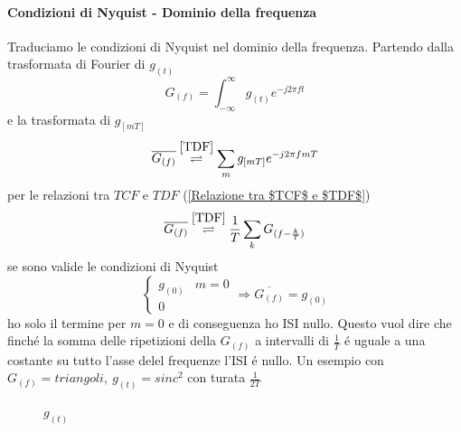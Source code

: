             \paragraph{Condizioni di Nyquist - Dominio della frequenza} Traduciamo le condizioni di Nyquist nel dominio della frequenza. Partendo
            dalla trasformata di Fourier di $g_{(t)}$
            \[
                G_{(f)} =\int_{-\infty}^{\infty}g_{(t)}e^{-j2\pi ft}    
            \]
            e la trasformata di $g_{[mT]}$
            \[
                \overline{G_{(f)}} \overset{\ref{TDF}}{\rightleftharpoons}\sum_{m}g_{[mT]}e^{-j2\pi fmT}    
            \]
            per le relazioni tra $TCF$ e $TDF$ (\ref{Relazione tra $TCF$ e $TDF$})
            \[
                \overline{G_{(f)}} \overset{\ref{TDF}}{\rightleftharpoons}\frac{1}{T}\sum_{k}G_{(f-\frac{k}{T})}    
            \]
            se sono valide le condizioni di Nyquist
            \[
                \begin{cases}
                    g_{(0)} & m=0\nonumber \\
                    0 &\nonumber
                \end{cases}  \Rightarrow \overline{G_{(f)}} = g_{(0)} 
            \]
            ho solo il termine per $m=0$ e di conseguenza ho ISI nullo. Questo vuol dire che finché la somma delle ripetizioni
            della $G_{(f)}$ a intervalli di $\frac{1}{T}$ é uguale a una costante su tutto l'asse delel frequenze l'ISI é nullo.
            Un esempio con $G_{(f)} = triangoli,\ g_{(t)} = sinc^2$ con turata $\frac{1}{2T}$
            \begin{figure}[H]
                \centering
                    \caption{$g_{(t)}$}          
            \end{figure}
